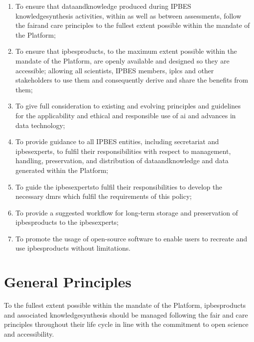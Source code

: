 \documentclass{article}
\begin{document}
\begin{enumerate}[label=(\alph*)]
    \item To ensure that \gls{dataandknowledge} produced during IPBES \gls{knowledgesynthesis} activities, within as well as between assessments, follow the \gls{fair}and \gls{care} principles to the fullest extent possible within the mandate of the Platform;
    
    \item To ensure that \glspl{ipbesproduct}, to the maximum extent possible within the mandate of the Platform, are openly available and designed so they are accessible; allowing all scientists, IPBES members, \glspl{iplc} and other \glspl{stakeholder} to use them and consequently derive and share the benefits from them;

    \item To give full consideration to existing and evolving principles and guidelines for the applicability and
    ethical and responsible use of \gls{ai} and advances in data technology;

    \item To provide guidance to all IPBES entities, including \gls{secretariat} and \glspl{ipbesexpert}, to fulfil their
    responsibilities with respect to management, handling, preservation, and distribution of \gls{dataandknowledge} and \gls{data} generated within the Platform;
    
    \item To guide the \glspl{ipbesexpert}to fulfil their responsibilities to develop the necessary \glspl{dmr} which fulfil the requirements of this policy;
    
    \item To provide a suggested \gls{workflow} for long-term storage and preservation of \glspl{ipbesproduct} to the \glspl{ipbesexpert};
    
    \item To promote the usage of open-source software to enable users to recreate and use \glspl{ipbesproduct} without limitations.
\end{enumerate}


\section{General Principles}

To the fullest extent possible within the mandate of the Platform, \glspl{ipbesproduct} and associated \gls{knowledgesynthesis} should be managed following the \gls{fair} and \gls{care} principles throughout their life cycle in line with the commitment to open science and accessibility.
\end{document}
